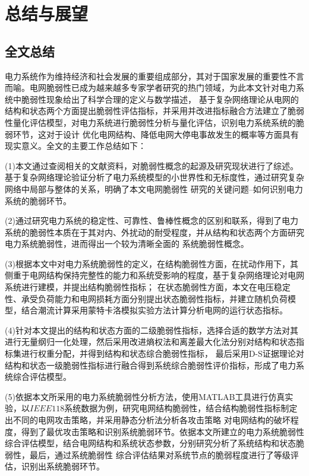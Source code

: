 \chapter{总结与展望}
\label{cha:summery}

\section{全文总结}
\label{sec:sum}
电力系统作为维持经济和社会发展的重要组成部分，其对于国家发展的重要性不言而喻。电网脆弱性已成为越来越多专家学者研究的热门领域，为此本文针对电力系统中脆弱性现象给出了科学合理的定义与数学描述，
基于复杂网络理论从电网的结构和状态两个方面提出脆弱性评估指标，并采用并改进指标融合方法建立了脆弱性量化评估模型，对电力系统进行脆弱性分析与量化评估，识别电力系统系统的脆弱环节，这对于设计
优化电网结构、降低电网大停电事故发生的概率等方面具有现实意义。全文的主要工作总结如下：

(1)本文通过查阅相关的文献资料，对脆弱性概念的起源及研究现状进行了综述。基于复杂网络理论验证分析了电力系统模型的小世界性和无标度性，通过研究复杂网络中局部与整体的关系，明确了本文电网脆弱性
研究的关键问题--如何识别电力系统的脆弱环节。

(2)通过研究电力系统的稳定性、可靠性、鲁棒性概念的区别和联系，得到了电力系统的脆弱性本质在于其对内、外扰动的耐受程度，并从结构和状态两个方面研究电力系统脆弱性，进而得出一个较为清晰全面的
系统脆弱性概念。

(3)根据本文中对电力系统脆弱性的定义，在结构脆弱性方面，在扰动作用下，其侧重于电网结构保持完整性的能力和系统受影响的程度，基于复杂网络理论对电网系统进行建模，并提出结构脆弱性指标；
在状态脆弱性方面，本文在电压稳定性、承受负荷能力和电网损耗方面分别提出状态脆弱性指标，并建立随机负荷模型，结合潮流计算采用蒙特卡洛模拟实验方法计算分析电网的运行状态指标。

(4)针对本文提出的结构和状态方面的二级脆弱性指标，选择合适的数学方法对其进行无量纲归一化处理，然后采用改进熵权法和离差最大化法分别对结构和状态指标集进行权重分配，并得到结构和状态综合脆弱性指标，
最后采用D-S证据理论对结构和状态一级脆弱性指标进行融合得到系统综合脆弱性评价指标，形成了电力系统综合评估模型。

(5)依据本文所采用的电力系统脆弱性分析方法，使用MATLAB工具进行仿真实验，以$IEEE118$系统数据为例，研究电网结构脆弱性，结合结构脆弱性指标制定出不同的电网攻击策略，并采用静态分析法分析各攻击策略
对电网结构的破坏程度，得到了最优攻击策略和识别系统脆弱环节。依据本文所建立的电力系统脆弱性综合评估模型，结合电网结构和系统状态参数，分别研究分析了系统结构和状态脆弱性，最后，通过系统脆弱性
综合评估结果对系统节点的脆弱程度进行了等级评估，识别出系统脆弱环节。

